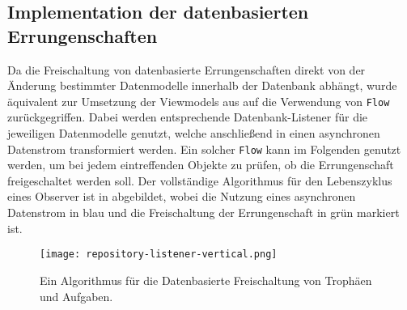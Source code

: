 \subsection{Implementation der datenbasierten Errungenschaften}\label{subsection:gamification-repository-listener}

Da die Freischaltung von datenbasierte Errungenschaften direkt von der Änderung bestimmter Datenmodelle innerhalb der Datenbank abhängt, wurde äquivalent zur Umsetzung der Viewmodels aus  auf die Verwendung von \texttt{Flow} zurückgegriffen. Dabei werden entsprechende Datenbank-Listener für die jeweiligen Datenmodelle genutzt, welche anschließend in einen asynchronen Datenstrom transformiert werden. Ein solcher \texttt{Flow} kann im Folgenden genutzt werden, um bei jedem eintreffenden Objekte zu prüfen, ob die Errungenschaft freigeschaltet werden soll. Der vollständige Algorithmus für den Lebenszyklus eines Observer ist in  abgebildet, wobei die Nutzung eines asynchronen Datenstrom in blau und die Freischaltung der Errungenschaft in grün markiert ist.  

\begin{figure}[H]
    \texttt{[image: repository-listener-vertical.png]}
    \caption{Ein Algorithmus für die Datenbasierte Freischaltung von Trophäen und Aufgaben.}\label{fig:repository-listener}
\end{figure}

